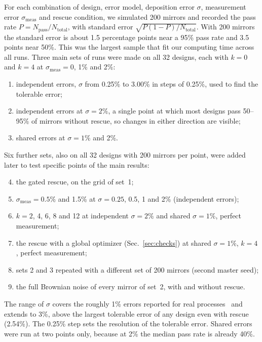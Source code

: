 For each combination of design, error model, deposition error $\sigma$, measurement error $\sigma_{\mathrm{meas}}$ and rescue condition, we simulated 200 mirrors and recorded the pass rate $P = N_{\mathrm{pass}}/N_{\mathrm{total}}$, with standard error $\sqrt{P(1-P)/N_{\mathrm{total}}}$. With 200 mirrors the standard error is about 1.5 percentage points near a 95\% pass rate and 3.5 points near 50\%. This was the largest sample that fit our computing time across all runs. Three main sets of runs were made on all 32 designs, each with $k = 0$ and $k = 4$ at $\sigma_{\mathrm{meas}} = 0$, 1\% and 2\%:
\begin{enumerate}
\item independent errors, $\sigma$ from 0.25\% to 3.00\% in steps of 0.25\%, used to find the tolerable error;
\item independent errors at $\sigma = 2\%$, a single point at which most designs pass 50--95\% of mirrors without rescue, so changes in either direction are visible;
\item shared errors at $\sigma = 1\%$ and 2\%.
\end{enumerate}
Six further sets, also on all 32 designs with 200 mirrors per point, were added later to test specific points of the main results:
\begin{enumerate}\setcounter{enumi}{3}
\item the gated rescue, on the grid of set~1;
\item $\sigma_{\mathrm{meas}} = 0.5\%$ and 1.5\% at $\sigma = 0.25$, 0.5, 1 and 2\% (independent errors);
\item $k = 2$, 4, 6, 8 and 12 at independent $\sigma = 2\%$ and shared $\sigma = 1\%$, perfect measurement;
\item the rescue with a global optimizer (Sec.~\ref{sec:checks}) at shared $\sigma = 1\%$, $k = 4$, perfect measurement;
\item sets 2 and 3 repeated with a different set of 200 mirrors (second master seed);
\item the full Brownian noise of every mirror of set~2, with and without rescue.
\end{enumerate}
The range of $\sigma$ covers the roughly 1\% errors reported for real processes~\cite{Tikhonravov2012,Wilbrandt2008} and extends to 3\%, above the largest tolerable error of any design even with rescue (2.54\%). The 0.25\% step sets the resolution of the tolerable error. Shared errors were run at two points only, because at 2\% the median pass rate is already 40\%.

